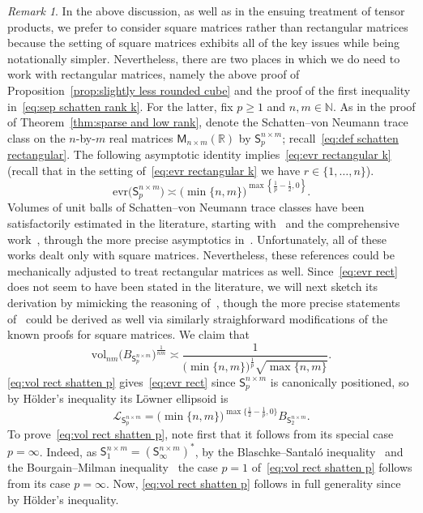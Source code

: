 \documentclass[11pt,reqno]{amsart}
\renewcommand{\ge}{\geqslant}
\newcommand{\evr}{\mathrm{evr}}
\newcommand{\n}{\{1,\ldots,n\}}
\newcommand{\R}{\mathbb R}
\theoremstyle{remark}
\newtheorem{remark}[theorem]{Remark}
\newcommand{\M}{\mathsf{M}}
\newcommand{\sfS}{\mathsf{S}}
\newcommand{\N}{\mathbb N}
\newcommand{\vol}{\mathrm{vol}}
\renewcommand{\1}{\mathbf 1}
\begin{document}
\begin{remark}\label{rem:rectangular schatten} In the above discussion, as well as in the ensuing treatment of tensor products, we prefer to consider square matrices rather than rectangular matrices because the setting of square matrices exhibits all of the key issues while being notationally simpler. Nevertheless, there are two places in which we do need to work with rectangular matrices, namely the above proof of Proposition~\ref{prop:slightly less rounded cube} and the proof of the first inequality in~\eqref{eq:sep schatten rank k}. For the latter, fix $p\ge 1$ and $n,m\in \N$. As in the proof of Theorem~\ref{thm:sparse and low rank}, denote the Schatten--von Neumann trace class on the $n$-by-$m$ real matrices $\M_{n\times m}(\R)$ by $\sfS_p^{n\times m}$; recall~\eqref{eq:def schatten rectangular}. The following asymptotic identity implies~\eqref{eq:evr rectangular k} (recall that in the setting of~\eqref{eq:evr rectangular k} we have $r\in \n$).
\begin{equation}\label{eq:evr rect}
\evr\big(\sfS^{n\times m}_p\big)\asymp \big(\min\{n,m\}\big)^{\max\left\{\frac{1}{p}-\frac12,0\right\}}.
\end{equation}
Volumes of unit balls of Schatten--von Neumann trace classes have been satisfactorily estimated in the literature, starting with~\cite{ST-J80} and the comprehensive work~\cite{Sch82}, through the more precise asymptotics in~\cite{S-R84,KPT20}. Unfortunately, all of these works dealt only with square matrices. Nevertheless, these references could be mechanically adjusted  to treat rectangular matrices as well. Since~\eqref{eq:evr rect} does not seem to have been stated in the literature, we will next  sketch its derivation by mimicking the reasoning of~\cite{Sch82}, though the more precise statements of~\cite{S-R84,KPT20} could  be derived as well via similarly straighforward modifications of the known proofs for square matrices. We claim that
\begin{equation}\label{eq:vol rect shatten p}
\vol_{nm}\big(B_{\sfS^{n\times m}_p}\big)^{\frac{1}{nm}}\asymp \frac{1}{\big(\min\{n,m\}\big)^{\frac{1}{p}}\sqrt{\max\{n,m\}}}.
\end{equation}
\eqref{eq:vol rect shatten p} gives~\eqref{eq:evr rect} since $\sfS_p^{n\times m}$ is canonically positioned, so by H\"older's inequality its  L\"owner ellipsoid is
$$
\mathscr{L}_{\sfS^{n\times m}_p}= \big(\min\{n,m\}\big)^{\max\big\{\frac12-\frac{1}{p},0\big\}}B_{\sfS^{n\times m}_2}.
$$
To prove~\eqref{eq:vol rect shatten p}, note first  that it follows from its special case $p=\infty$. Indeed, as $\sfS^{n\times m}_1=(\sfS^{n\times m}_\infty)^*$, by the Blaschke--Santal\'o inequality~\cite{Bla17,San49} and the Bourgain--Milman inequality~\cite{BM87} the case $p=1$ of~\eqref{eq:vol rect shatten p} follows from its case $p=\infty$. Now, \eqref{eq:vol rect shatten p}  follows in full generality since by H\"older's inequality.

\end{remark}
\end{document}
